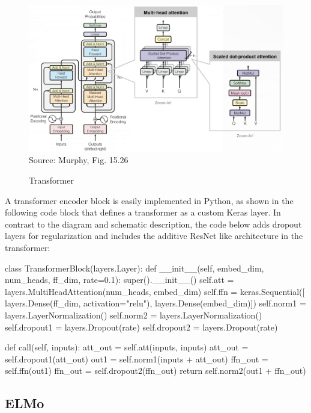 \begin{figure}
\centering

\includegraphics[width=\textwidth]{murphy_15_26.png} \\

\scriptsize Source: Murphy, Fig. 15.26 \normalsize
\caption{Transformer}
\label{fig:transformer}
\end{figure}

A transformer encoder block is easily implemented in Python, as shown in the following code block that defines a transformer as a custom Keras layer. In contrast to the diagram and schematic description, the code below adds dropout layers for regularization and includes the additive ResNet like architecture in the transformer:

\begin{pythoncode}
class TransformerBlock(layers.Layer):
    def __init__(self, embed_dim, num_heads, ff_dim, rate=0.1):
        super().__init__()
        self.att = layers.MultiHeadAttention(num_heads, embed_dim)
        self.ffn = keras.Sequential([
                layers.Dense(ff_dim, activation="relu"),
                layers.Dense(embed_dim)])
        self.norm1 = layers.LayerNormalization()
        self.norm2 = layers.LayerNormalization()
        self.dropout1 = layers.Dropout(rate)
        self.dropout2 = layers.Dropout(rate)

    def call(self, inputs):
        att_out = self.att(inputs, inputs)
        att_out = self.dropout1(att_out)
        out1 = self.norm1(inputs + att_out)
        ffn_out = self.ffn(out1)
        ffn_out = self.dropout2(ffn_out)
        return self.norm2(out1 + ffn_out)
\end{pythoncode}

\FloatBarrier

\subsection*{ELMo}

